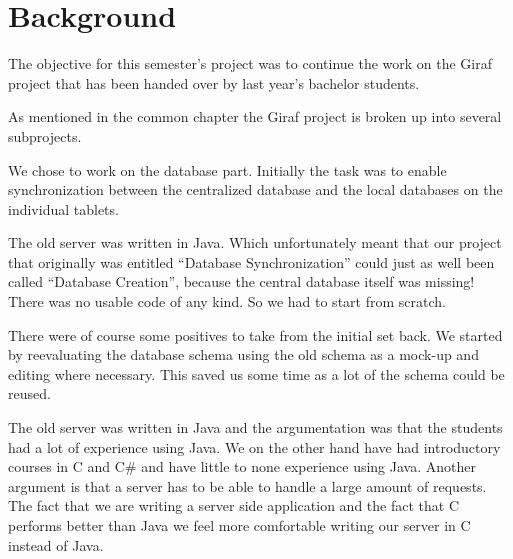 \section{Background}
The objective for this semester's project was to continue the work on the Giraf project that has been handed over by last year's bachelor students.

As mentioned in the common chapter the Giraf project is broken up into several subprojects. 

We chose to work on the database part. Initially the task was to enable synchronization between the centralized database and the local databases on the individual tablets.

The old server was written in Java. Which unfortunately meant that our project that originally was entitled ``Database Synchronization'' could just as well been called ``Database Creation'', because the central database itself was missing! There was no usable code of any kind. So we had to start from scratch.

There were of course some positives to take from the initial set back. We started by reevaluating the database schema using the old schema as a mock-up and editing where necessary. This saved us some time as a lot of the schema could be reused.

The old server was written in Java and the argumentation was that the students had a lot of experience using Java.
We on the other hand have had introductory courses in C and C\# and have little to none experience using Java. Another argument is that a server has to be able to handle a large amount of requests. The fact that we are writing a server side application and the fact that C performs better than Java we feel more comfortable writing our server in C instead of Java.
